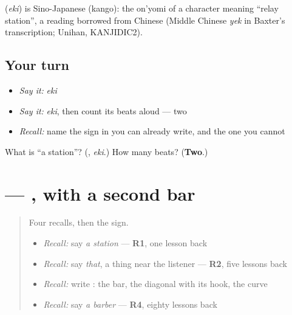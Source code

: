 \begin{cousinweb}
\textbf{} (\emph{eki}) is Sino-Japanese (kango): the on'yomi of a character meaning \textquotedblleft{}relay station\textquotedblright{}, a reading borrowed from Chinese (Middle Chinese \emph{yek} in Baxter's transcription; Unihan, KANJIDIC2).
\end{cousinweb}

\subsection*{Your turn}
\begin{itemize}
\raggedright
  \item \emph{Say it:} \emph{eki}
  \item \emph{Say it:} \emph{eki}, then count its beats aloud — two
  \item \emph{Recall:} name the sign in \textbf{} you can already write, and the one you cannot
\end{itemize}

\begin{tcolorbox}[breakable,colback=teal!4,colframe=teal!35!black,title={Before you move on}]
What is \textquotedblleft{}a station\textquotedblright{}? (\textbf{}, \emph{eki}.) How many beats? (\textbf{Two}.)
\end{tcolorbox}
\section[\texorpdfstring{\ja{き} (ki)}{き (ki)}]{ — , with a second bar}

\label{lesson:JA-W133-ki}



\begin{quote}
Four recalls, then the sign.

\begin{itemize}
\raggedright
  \item \emph{Recall:} say \emph{a station} — \textbf{R1}, one lesson back
  \item \emph{Recall:} say \emph{that}, a thing near the listener — \textbf{R2}, five lessons back
  \item \emph{Recall:} write \textbf{}: the bar, the diagonal with its hook, the curve
  \item \emph{Recall:} say \emph{a barber} — \textbf{R4}, eighty lessons back
\end{itemize}
\end{quote}

